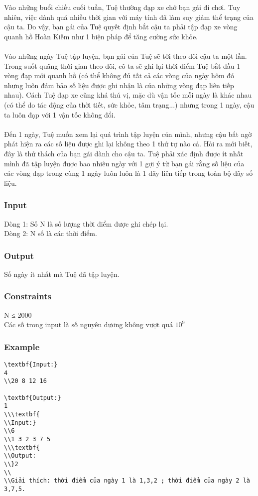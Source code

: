 



   Vào những buổi chiều cuối tuần, Tuệ thường đạp xe chở bạn gái đi chơi. Tuy nhiên, việc dành quá nhiều thời gian với máy tính đã làm suy giảm thể trạng của cậu ta. Do vậy, bạn gái của Tuệ quyết định bắt cậu ta phải tập đạp xe vòng quanh hồ Hoàn Kiếm như 1 biện pháp để tăng cường sức khỏe.   
\\
\\   Vào những ngày Tuệ tập luyện, bạn gái của Tuệ sẽ tới theo dõi cậu ta một lần. Trong suốt quãng thời gian theo dõi, cô ta sẽ ghi lại thời điểm Tuệ bắt đầu 1 vòng đạp mới quanh hồ (có thể không đủ tất cả các vòng của ngày hôm đó nhưng luôn đảm bảo số liệu được ghi nhận là của những vòng đạp liên tiếp nhau). Cách Tuệ đạp xe cũng khá thú vị, mặc dù vận tốc mỗi ngày là khác nhau (có thể do tác động của thời tiết, sức khỏe, tâm trạng...) nhưng trong 1 ngày, cậu ta luôn đạp với 1 vận tốc không đổi.   
\\
\\   Đến 1 ngày, Tuệ muốn xem lại quá trình tập luyện của mình, nhưng cậu bất ngờ phát hiện ra các số liệu được ghi lại không theo 1 thứ tự nào cả. Hỏi ra mới biết, đây là thử thách của bạn gái dành cho cậu ta. Tuệ phải xác định được ít nhất mình đã tập luyện được bao nhiêu ngày với 1 gợi ý từ bạn gái rằng số liệu của các vòng đạp trong cùng 1 ngày luôn luôn là 1 dãy liên tiếp trong toàn bộ dãy số liệu.  

\subsubsection{   Input  }

   Dòng 1: Số N là số lượng thời điểm được ghi chép lại.   
\\   Dòng 2: N số là các thời điểm.  

\subsubsection{   Output  }

   Số ngày ít nhất mà Tuệ đã tập luyện.  

\subsubsection{   Constraints  }

   N ≤ 2000   
\\   Các số trong input là số nguyên dương không vượt quá $10^{9}$

\subsubsection{   Example  }
\begin{verbatim}
\textbf{Input:}
4
\\20 8 12 16

\textbf{Output:}
1
\\\textbf{
\\Input:}
\\6
\\1 3 2 3 7 5
\\\textbf{
\\Output:
\\}2
\\
\\Giải thích: thời điểm của ngày 1 là 1,3,2 ; thời điểm của ngày 2 là 3,7,5.\end{verbatim}
